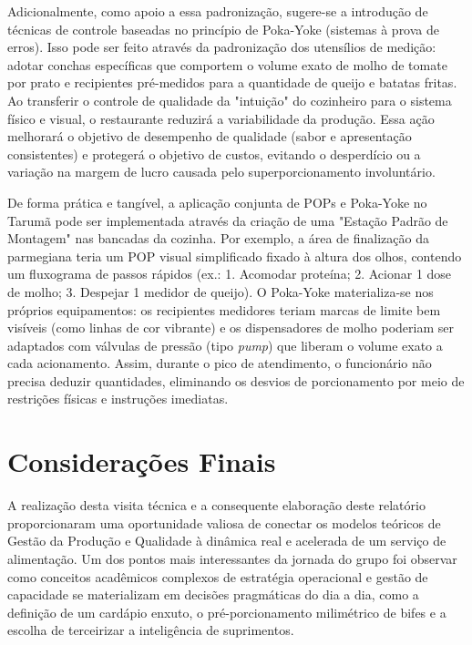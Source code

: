 \documentclass[12pt, a4paper]{article}
\begin{document}
Adicionalmente, como apoio a essa padronização, sugere-se a introdução de técnicas de controle baseadas no princípio de Poka-Yoke (sistemas à prova de erros). Isso pode ser feito através da padronização dos utensílios de medição: adotar conchas específicas que comportem o volume exato de molho de tomate por prato e recipientes pré-medidos para a quantidade de queijo e batatas fritas. Ao transferir o controle de qualidade da "intuição" do cozinheiro para o sistema físico e visual, o restaurante reduzirá a variabilidade da produção. Essa ação melhorará o objetivo de desempenho de qualidade (sabor e apresentação consistentes) e protegerá o objetivo de custos, evitando o desperdício ou a variação na margem de lucro causada pelo superporcionamento involuntário.

De forma prática e tangível, a aplicação conjunta de POPs e Poka-Yoke no Tarumã pode ser implementada através da criação de uma "Estação Padrão de Montagem" nas bancadas da cozinha. Por exemplo, a área de finalização da parmegiana teria um POP visual simplificado fixado à altura dos olhos, contendo um fluxograma de passos rápidos (ex.: 1. Acomodar proteína; 2. Acionar 1 dose de molho; 3. Despejar 1 medidor de queijo). O Poka-Yoke materializa-se nos próprios equipamentos: os recipientes medidores teriam marcas de limite bem visíveis (como linhas de cor vibrante) e os dispensadores de molho poderiam ser adaptados com válvulas de pressão (tipo \textit{pump}) que liberam o volume exato a cada acionamento. Assim, durante o pico de atendimento, o funcionário não precisa deduzir quantidades, eliminando os desvios de porcionamento por meio de restrições físicas e instruções imediatas.


\section{Considerações Finais}

A realização desta visita técnica e a consequente elaboração deste relatório proporcionaram uma oportunidade valiosa de conectar os modelos teóricos de Gestão da Produção e Qualidade à dinâmica real e acelerada de um serviço de alimentação. Um dos pontos mais interessantes da jornada do grupo foi observar como conceitos acadêmicos complexos de estratégia operacional e gestão de capacidade se materializam em decisões pragmáticas do dia a dia, como a definição de um cardápio enxuto, o pré-porcionamento milimétrico de bifes e a escolha de terceirizar a inteligência de suprimentos.
\end{document}
